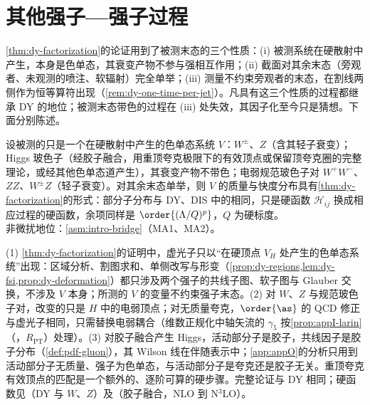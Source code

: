 \section{其他强子—强子过程}\label{sec:dy-other}

\cref{thm:dy-factorization}的论证用到了被测末态的三个性质：(i) 被测系统在硬散射中产生，本身是色单态，其衰变产物不参与强相互作用；(ii) 截面对其余末态（旁观者、未观测的喷注、软辐射）完全单举；(iii) 测量不约束旁观者的末态，在割线两侧作为恒等算符出现（\cref{rem:dy-one-time-per-jet}）。凡具有这三个性质的过程都继承 DY 的地位；被测末态带色的过程在 (iii) 处失效，其因子化至今只是猜想。下面分别陈述。

\begin{theorem}\label{thm:dy-colour-singlet}
设被测的只是一个在硬散射中产生的色单态系统 $V$：$W^\pm$、$Z$（含其轻子衰变）；Higgs 玻色子（经胶子融合，用重顶夸克极限下的有效顶点或保留顶夸克圈的完整理论，或经其他色单态道产生），其衰变产物不带色；电弱规范玻色子对 $W^+W^-$、$ZZ$、$W^\pm Z$（轻子衰变）。对其余末态单举，则 $V$ 的质量与快度分布具有\cref{thm:dy-factorization}的形式：部分子分布与 DY、DIS 中的相同，只是硬函数 $\mathcal H_{ij}$ 换成相应过程的硬函数，余项同样是 $\order{(\Lambda/Q)^p}$，$Q$ 为硬标度。\\
非微扰地位：\cref{asm:intro-bridge}（MA1、MA2）。
\end{theorem}

\begin{proofsketch}
(1) \cref{thm:dy-factorization}的证明中，虚光子只以“在硬顶点 $V_H$ 处产生的色单态系统”出现：区域分析、割图求和、单侧改写与形变（\cref{prop:dy-regions,lem:dy-fsi,prop:dy-deformation}）都只涉及两个强子的共线子图、软子图与 Glauber 交换，不涉及 $V$ 本身；所测的 $V$ 的变量不约束强子末态。(2) 对 $W$、$Z$ 与规范玻色子对，改变的只是 $H$ 中的电弱顶点；对无质量夸克，$\order{\as}$ 的 QCD 修正与虚光子相同，只需替换电弱耦合（维数正规化中轴矢流的 $\gamma_5$ 按\cref{prop:appI-larin}（\tagR，$R_{\mathrm{PT}}$）处理）。(3) 对胶子融合产生 Higgs，活动部分子是胶子，共线因子是胶子分布（\cref{def:pdf-gluon}），其 Wilson 线在伴随表示中；\cref{app:appO}的分析只用到活动部分子无质量、强子为色单态，与活动部分子是夸克还是胶子无关。重顶夸克有效顶点的匹配是一个额外的、逐阶可算的硬步骤。完整论证与 DY 相同\cite[第~14.4~节]{Collins2011}；硬函数见\cite{AltarelliEllisMartinelli1979,HambergVanNeervenMatsuura1991}（DY 与 $W$、$Z$）及\cite{Dawson1991,DjouadiSpiraZerwas1991,HarlanderKilgore2002,AnastasiouEtAl2015}（胶子融合，NLO 到 N$^3$LO）。
\end{proofsketch}

